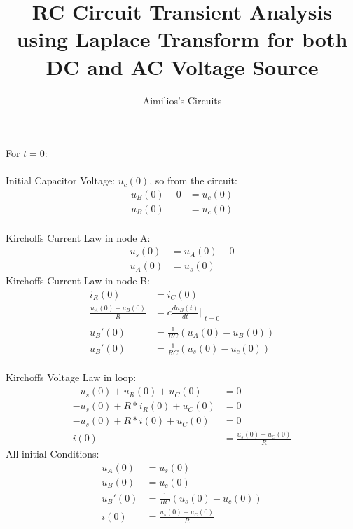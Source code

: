 \documentclass{article}
\title{RC Circuit Transient Analysis using Laplace Transform for both DC and AC Voltage Source }
\author{Aimilios's Circuits}
\begin{document}
\maketitle
{}

\section{} For $t=0$:\\
    \\Initial Capacitor Voltage: $u_c(0)$, so from the circuit:
    \begin{align}
        u_B(0)-0& = u_c(0)  \nonumber\\
        u_B(0) &= u_c(0)    \label{eq1}
    \end{align}
 \\ Kirchoffs Current Law in node A:
\begin{align}
       u_s(0) &= u_A(0) - 0 \nonumber \\
       u_A(0) &= u_s(0)     \label{eq2}
\end{align}
Kirchoffs Current Law in node B:
\begin{align}
    i_R(0)&=i_C(0) \nonumber \\
    \frac{u_A(0)-u_B(0)}{R} &= c \frac{du_B(t)}{dt}|_{\substack{t=0}} \nonumber \\
    u_B'(0)&=\frac{1}{RC}(u_A(0)-u_B(0)) \nonumber \\
  u_B'(0)&=\frac{1}{RC}(u_s(0)-u_c(0)) \label{eq3} 
\end{align}
 \\ Kirchoffs Voltage Law in loop:
\begin{align}
      -u_s(0)+u_R(0)+u_C(0)&=0 \nonumber\\
      -u_s(0)+R*i_R(0)+u_C(0)&=0 \nonumber\\
      -u_s(0)+R*i(0)+u_C(0)&=0 \nonumber\\
      i(0)&=\frac{u_s(0)-u_C(0)}{R} \label{eqn4}
\end{align}
All initial Conditions:
\begin{align}
      u_A(0) &= u_s(0) \nonumber\\
      u_B(0) &= u_c(0)\nonumber\\
      u_B'(0)&=\frac{1}{RC}(u_s(0)-u_c(0))\nonumber\\
      i(0)&=\frac{u_s(0)-u_C(0)}{R}\nonumber
\end{align}
\end{document}
